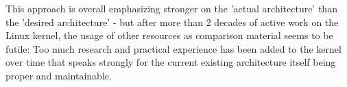 \documentclass{article}
\begin{document}
This approach is overall emphasizing stronger on the 'actual architecture' than the 'desired architecture' - but after more than 2 decades of active work on the Linux kernel, the usage of other resources as comparison material seems to be futile:
Too much research and practical experience has been added to the kernel over time that speaks strongly for the current existing architecture itself being proper and maintainable.


	
\end{document}
